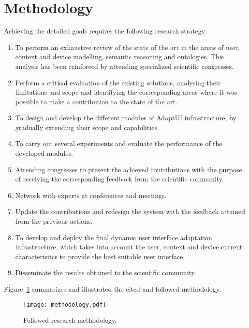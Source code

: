 
\section{Methodology}
\label{sec:methodology}

Achieving the detailed goals requires the following research strategy:

\begin{enumerate}[label=\alph*)]
  \item To perform an exhaustive review of the state of the art in the areas 
  of user, context and device modelling, semantic reasoning and ontologies.   
  This analysis has been reinforced by attending specialized scientific   
  congresses.
  
  \item Perform a critical evaluation of the existing solutions, analysing 
  their limitations and scope and identifying the corresponding areas where it 
  was possible to make a contribution to the state of the art.
  
  \item To design and develop the different modules of AdaptUI infrastructure, 
  by gradually extending their scope and capabilities.
  
  \item To carry out several experiments and evaluate the performance of the 
  developed modules.
  
  \item Attending congresses to present the achieved contributions with the 
  purpose of receiving the corresponding feedback from the scientific 
  community.
  
  \item Network with experts at conferences and meetings.
  
  \item Update the contributions and redesign the system with the feedback 
  attained from the previous actions.
  
  \item To develop and deploy the final dynamic user interface adaptation 
  infrastructure, which takes into account the user, context and device current 
  characteristics to provide the best suitable user interface.
  
  \item Disseminate the results obtained to the scientific community.
\end{enumerate}

Figure~\ref{fig:methodology} summarizes and illustrated the cited and 
followed methodology.


\begin{figure}[H]
\centering
\texttt{[image: methodology.pdf]}
\caption{Followed research methodology.}
\label{fig:methodology}
\end{figure}